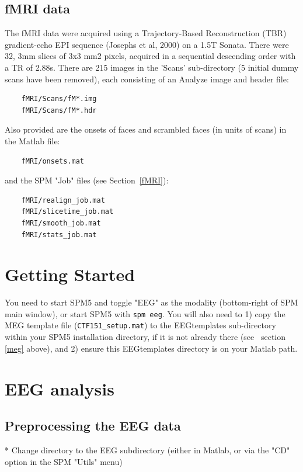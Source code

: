 \subsection{fMRI data}

The fMRI data were acquired using a Trajectory-Based Reconstruction (TBR) gradient-echo EPI sequence (Josephs et al, 2000) on a 1.5T Sonata. There were 32, 3mm slices of 3x3 mm2 pixels, acquired in a sequential descending order with a TR of 2.88s. There are 215 images in the 'Scans' sub-directory (5 initial dummy scans have been removed), each consisting of an Analyze image and header file:
\begin{verbatim}
    fMRI/Scans/fM*.img  
    fMRI/Scans/fM*.hdr
\end{verbatim}
Also provided are the onsets of faces and scrambled faces (in units of scans) in the Matlab file:
\begin{verbatim}
    fMRI/onsets.mat 
\end{verbatim}
and the SPM "Job" files (see Section~\ref{fMRI}):
\begin{verbatim}
    fMRI/realign_job.mat
    fMRI/slicetime_job.mat
    fMRI/smooth_job.mat
    fMRI/stats_job.mat
\end{verbatim}

\section{Getting Started}

You need to start SPM5 and toggle "EEG" as the modality (bottom-right of SPM main window), or start SPM5 with \verb!spm eeg!.
You will also need to 1) copy the MEG template file (\verb!CTF151_setup.mat!) to the EEGtemplates sub-directory within your SPM5 installation directory, if it is not already there (see ~section \ref{meg} above), and 2) ensure this EEGtemplates directory is on your Matlab path.


\section{EEG analysis}

\subsection{Preprocessing the EEG data}

* Change directory to the EEG subdirectory (either in Matlab, or via the "CD" option in the SPM "Utils" menu)

